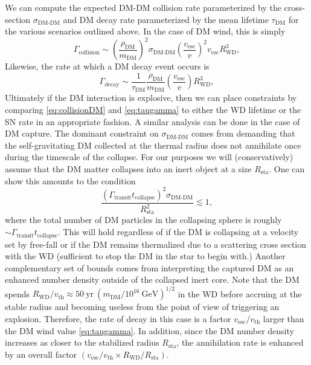 \documentclass[twocolumn,preprintnumbers,amsmath,amssymb,prl, superscriptaddress]{revtex4}
\newcommand{\GeV}{\text{GeV}}
\def\r{\right)}
\def\l{\left(}
\begin{document}
We can compute the expected DM-DM collision rate parameterized by the cross-section $\sigma_\text{DM-DM}$ and DM decay rate parameterized by the mean lifetime $\tau_\text{DM}$ for the various scenarios outlined above.
In the case of DM wind, this is simply
\begin{equation}
\Gamma_\text{collision} \sim \l \frac{\rho_\text{DM}}{m_\text{DM}} \r^2 \sigma_\text{DM-DM} \l \frac{v_\text{esc}}{v}\r^2 v_\text{esc} R_\text{WD}^3,
\label{eq:collisionDM}
\end{equation}
Likewise, the rate at which a DM decay event occurs is
\begin{equation}
\Gamma_\text{decay} \sim  \frac{1}{\tau_\text{DM}} \frac{\rho_{\text{DM}}}{m_\text{DM}} \l \frac{v_\text{esc}}{v}\r R_\text{WD}^3,
\label{eq:taugamma}
\end{equation}
Ultimately if the DM interaction is explosive, then we can place constraints by comparing \eqref{eq:collisionDM} and \eqref{eq:taugamma} to either the WD lifetime or the SN rate in an appropriate fashion. 
A similar analysis can be done in the case of DM capture. 
The dominant constraint on $\sigma_\text{DM-DM}$ comes from demanding that the self-gravitating DM collected at the thermal radius does not annihilate once during the timescale of the collapse. 
For our purposes we will (conservatively) assume that the DM matter collapses into an inert object at a size $R_\text{sta}$. 
One can show this amounts to the condition 
\begin{equation}
\frac{(\Gamma_\text{transit} t_\text{collapse})^2 \sigma_\text{DM-DM}}{R_\text{sta}^2} \lesssim 1,
\end{equation}
where the total number of DM particles in the collapsing sphere is roughly $\sim \Gamma_\text{transit} t_\text{collapse}$.  
This will hold regardless of if the DM is collapsing at a velocity set by free-fall or if the DM remains thermalized due to a scattering cross section with the WD (sufficient to stop the DM in the star to begin with.)
Another complementary set of bounds comes from interpreting the captured DM as an enhanced number density outside of the collapsed inert core. 
Note that the DM spends $R_\text{WD}/v_\text{th} \approx 50 ~\text{yr} ~(m_\text{DM}/10^{16} ~\GeV)^{1/2}$ in the WD before accruing at the stable radius and becoming useless from the point of view of triggering an explosion. 
Therefore, the rate of decay in this case is a factor $v_\text{esc}/v_\text{th}$ larger than the DM wind value \eqref{eq:taugamma}.
In addition, since the DM number density increases as closer to the stabilized radius $R_\text{sta}$, the annihilation rate is enhanced by an overall factor $(v_\text{esc}/v_\text{th} \times R_\text{WD}/R_\text{sta})$. 
\end{document}
